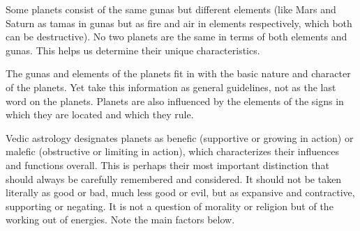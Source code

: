  

Some planets consist of the same gunas but different elements (like Mars and Saturn as tamas in gunas but as fire and air in elements respectively, which both can be destructive). No two planets are the same in terms of both elements and gunas. This helps us determine their unique characteristics.

 

The gunas and elements of the planets fit in with the basic nature and character of the planets. Yet take this information as general guidelines, not as the last word on the planets. Planets are also influenced by the elements of the signs in which they are located and which they rule.

 


 

Vedic astrology designates planets as benefic (supportive or growing in action) or malefic (obstructive or limiting in action), which characterizes their influences and functions overall. This is perhaps their most important distinction that should always be carefully remembered and considered. It should not be taken literally as good or bad, much less good or evil, but as expansive and contractive, supporting or negating. It is not a question of morality or religion but of the working out of energies. Note the main factors below.

 

